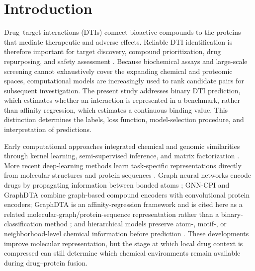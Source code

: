 \documentclass[computers,article,submit,moreauthors]{Definitions/mdpi}
\begin{document}
\section{Introduction}
Drug--target interactions (DTIs) connect bioactive compounds to the proteins that mediate therapeutic and adverse effects. Reliable DTI identification is therefore important for target discovery, compound prioritization, drug repurposing, and safety assessment \citep{yamanishi2008,bagherian2021}. Because biochemical assays and large-scale screening cannot exhaustively cover the expanding chemical and proteomic spaces, computational models are increasingly used to rank candidate pairs for subsequent investigation. The present study addresses binary DTI prediction, which estimates whether an interaction is represented in a benchmark, rather than affinity regression, which estimates a continuous binding value. This distinction determines the labels, loss function, model-selection procedure, and interpretation of predictions.

Early computational approaches integrated chemical and genomic similarities through kernel learning, semi-supervised inference, and matrix factorization \citep{xia2010,gonen2012}. More recent deep-learning methods learn task-specific representations directly from molecular structures and protein sequences \citep{wen2020}. Graph neural networks encode drugs by propagating information between bonded atoms \citep{duvenaud2015,kipf2017}; GNN-CPI and GraphDTA combine graph-based compound encoders with convolutional protein encoders; GraphDTA is an affinity-regression framework and is cited here as a related molecular-graph/protein-sequence representation rather than a binary-classification method \citep{tsubaki2019,nguyen2021graphdta}; and hierarchical models preserve atom-, motif-, or neighborhood-level chemical information before prediction \citep{liu2024higraphdti,zhang2021ngnn}. These developments improve molecular representation, but the stage at which local drug context is compressed can still determine which chemical environments remain available during drug--protein fusion.
\end{document}
